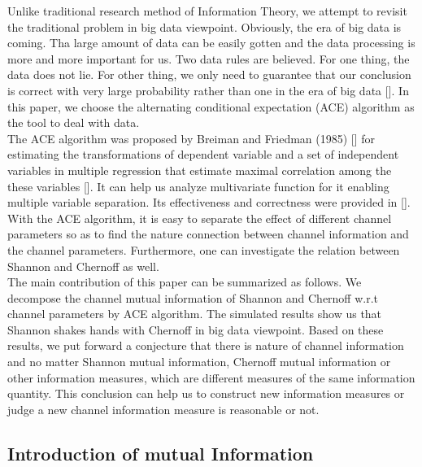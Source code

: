 \documentclass[conference]{IEEEtran}
\begin{document}
Unlike traditional research method of Information Theory, we attempt to revisit the traditional problem in big data viewpoint. Obviously, the era of big data is coming. Tha large amount of data can be easily gotten and the data processing is more and more important for us. Two data rules are believed. For one thing, the data does not lie. For other thing, we only need to guarantee that our conclusion is correct with very large probability rather than one in the era of big data [\cite{vapnik2006estimation}]. In this paper, we choose the alternating conditional expectation (ACE) algorithm as the tool to deal with data.\\

The ACE algorithm was proposed by Breiman and Friedman (1985) [\cite{breiman1985estimating}] for estimating the transformations of dependent variable and a set of independent variables in multiple regression that  estimate maximal correlation among the these variables [\cite{wang2004estimating}]. It can help us analyze multivariate function for it enabling multiple variable separation. Its effectiveness and correctness were provided in [\cite{breiman1985estimating}]. With the ACE algorithm, it is easy to separate the effect of different channel parameters so as to find the nature connection between channel information and the channel parameters. Furthermore, one can investigate the relation between Shannon and Chernoff as well.\\

The main contribution of this paper can be summarized as follows. We decompose the channel mutual information of Shannon and Chernoff w.r.t channel parameters by ACE algorithm. The simulated results show us that Shannon shakes hands with Chernoff in big data viewpoint. Based on these results, we put forward a conjecture that there is nature of channel information and no matter Shannon mutual information, Chernoff mutual information or other information measures, which are different measures of the same information quantity. This conclusion can help us to construct new information measures or  judge a new channel information measure is reasonable or not. \\



\subsection{Introduction of mutual Information}
\end{document}

